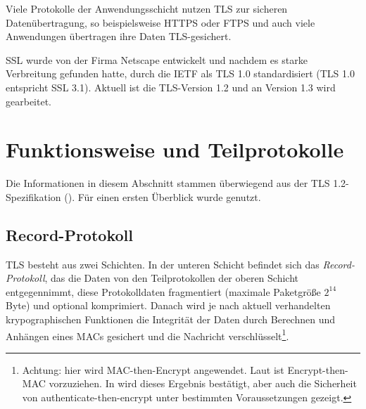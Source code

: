 \documentclass[
    12pt,
    headings=small,
    parskip=half,           %
    bibliography=totoc,
    numbers=noenddot,       %
    open=any,               %
   final                   %
    ]{scrreprt}
\begin{document}
Viele Protokolle der Anwendungsschicht nutzen TLS zur sicheren Datenübertragung, so beispielsweise HTTPS oder FTPS und auch viele Anwendungen übertragen ihre Daten TLS-gesichert.

SSL wurde von der Firma Netscape entwickelt und nachdem es starke Verbreitung gefunden hatte, durch die IETF als TLS 1.0 standardisiert (TLS 1.0 entspricht SSL 3.1). Aktuell ist die TLS-Version 1.2 und an Version 1.3 wird gearbeitet.


\chapter{Funktionsweise und Teilprotokolle}

Die Informationen in diesem Abschnitt stammen überwiegend aus der TLS 1.2-Spezifikation (\cite{tls12}). Für einen ersten Überblick wurde \cite{eckert13} genutzt.

\section{Record-Protokoll}

TLS besteht aus zwei Schichten. In der unteren Schicht befindet sich das \emph{Record-Protokoll}, das die Daten von den Teilprotokollen der oberen Schicht entgegennimmt, diese Protokolldaten fragmentiert (maximale Paketgröße \(2^{14}\) Byte) und optional komprimiert. Danach wird je nach aktuell verhandelten krypographischen Funktionen die Integrität der Daten durch Berechnen und Anhängen eines MACs gesichert und die Nachricht verschlüsselt\footnote{Achtung: hier wird MAC-then-Encrypt angewendet. Laut \cite{AE2000} ist Encrypt-then-MAC vorzuziehen. In \cite{krawczyk01} wird dieses Ergebnis bestätigt, aber auch die Sicherheit von authenticate-then-encrypt unter bestimmten Voraussetzungen gezeigt.}. 
\end{document}
